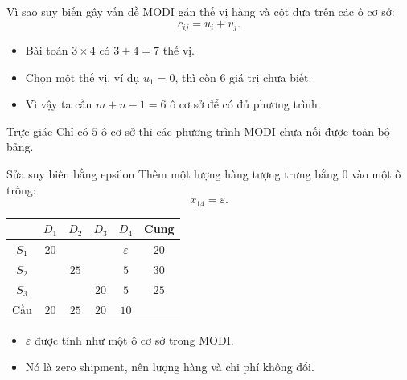 \documentclass[10pt]{beamer}
\begin{document}
\begin{frame}{Vì sao suy biến gây vấn đề}
    MODI gán thế vị hàng và cột dựa trên các ô cơ sở:
    \[
        c_{ij}=u_i+v_j.
    \]

    \vspace{0.2cm}
    \begin{itemize}
        \item Bài toán $3 \times 4$ có $3+4=7$ thế vị.
        \item Chọn một thế vị, ví dụ $u_1=0$, thì còn $6$ giá trị chưa biết.
        \item Vì vậy ta cần $m+n-1=6$ ô cơ sở để có đủ phương trình.
    \end{itemize}

    \vspace{0.2cm}
    \begin{block}{Trực giác}
        Chỉ có $5$ ô cơ sở thì các phương trình MODI chưa nối được toàn bộ bảng.
    \end{block}
\end{frame}

\begin{frame}{Sửa suy biến bằng epsilon}
    Thêm một lượng hàng tượng trưng bằng $0$ vào một ô trống:
    \[
        x_{14}=\varepsilon.
    \]

    \centering
    \renewcommand{\arraystretch}{1.25}
    \begin{tabular}{c|cccc|c}
        & $D_1$ & $D_2$ & $D_3$ & $D_4$ & Cung\\
        \hline
        $S_1$ & \cellcolor{occupied}$20$ & & & \cellcolor{epsiloncell}$\varepsilon$ & $20$\\
        $S_2$ & & \cellcolor{occupied}$25$ & & \cellcolor{occupied}$5$ & $30$\\
        $S_3$ & & & \cellcolor{occupied}$20$ & \cellcolor{occupied}$5$ & $25$\\
        \hline
        Cầu & $20$ & $25$ & $20$ & $10$ &
    \end{tabular}

    \vspace{0.25cm}
    \begin{itemize}
        \item $\varepsilon$ được tính như một ô cơ sở trong MODI.
        \item Nó là zero shipment, nên lượng hàng và chi phí không đổi.
    \end{itemize}
\end{frame}
\end{document}
